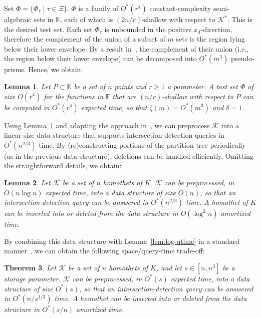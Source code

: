 \documentclass[11pt]{article}
\def\Fspace{{\mathbb F}}
\def\Kspace{{\mathbb K}}
\def\K{\mathcal{K}}
\def\cell{\tau}
\newtheorem{theorem}{Theorem}[section]
\newtheorem{lemma}[theorem]{Lemma}
\theoremstyle{definition}
\begin{document}
Set $\Phi = \{\Phi_\cell \mid \cell \in \Xi\}$.
$\Phi$ is a family of $O^*(r^4)$ constant-complexity semi-algebraic 
sets
in $\Kspace$, each of which is $(2n/r)$-shallow with respect to $\K^*$. This is the desired test set.
Each set $\Phi_\cell$ is unbounded in the positive $x_4$-direction, therefore the 
complement of the union of a subset of $m$ sets is the region lying below their 
lower envelope. By a result in~\cite{AES:vd}, the complement of their union (i.e., the 
region below their lower envelope) can be decomposed into $O^*(m^3)$ pseudo-prisms. Hence, we obtain:
\begin{lemma} \label{lem:btest}
Let $P\subset \Kspace$ be a set of $n$ points and $r\ge 1$ a parameter. A test set $\Phi$ 
	of size $O(r^4)$ for the functions in $\Fspace$ that are $(n/r)$-shallow 
	with respect to $P$ can be computed in $O^*(r^4)$ expected time, so that
	$\zeta(m)=O^*(m^3)$ and $\delta=1$.
\end{lemma}

Using Lemma~\ref{lem:btest} and adapting the approach in~\cite{ShSh}, we can preprocess $\K$ into
a linear-size data structure that supports intersection-detection queries in $O^*(n^{2/3})$ time. 
By (re)constructing portions of the partition tree periodically (as in the previous data structure), 
deletions can be handled efficiently. Omitting the straightforward details, we obtain:

\begin{lemma}
	\label{lem:linear-qtime}
Let $\K$ be a set of $n$ homothets of $K$.  $\K$ can be preprocessed,
in $O(n\log n)$ expected time, into a data structure of size $O(n)$, so that an intersection-detection query 
can be answered in $O^*(n^{2/3})$ time. A homothet of $K$ 
can be inserted into or deleted from the data structure in $O(\log^2 n)$ amortized time.
\end{lemma}

By combining this data structure with Lemma~\ref{lem:log-qtime} in a 
standard manner~\cite{AAEKS}, we can 
obtain the following space/query-time trade-off:
\begin{theorem}
	\label{thm:tradeoff}
	Let $\K$ be a set of $n$ homothets of $K$, and let $s\in[n,n^3]$ be a storage parameter.  
        $\K$ can be preprocessed, in $O^*(s)$ expected time, into a data structure of size $O^*(s)$, so 
	that an intersection-detection query can be answered 
	in $O^*(n/s^{1/3})$ time. A homothet can be inserted into 
	or deleted from the data structure in $O^*(s/n)$ amortized time.
\end{theorem}
\end{document}
